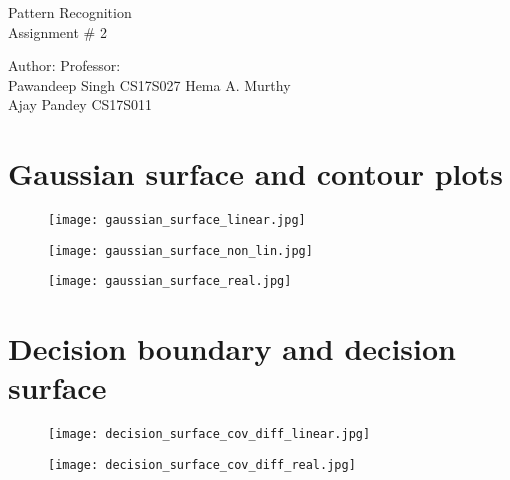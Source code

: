 \documentclass{article}
\begin{document}
	\begin{center}
		\vspace*{10mm}
		{\Huge Pattern Recognition \\}
		\vspace{5mm}
		{\huge Assignment \# 2 \\}
		\vspace{20mm}
	\end{center}
	{\large Author}: \hfill \hfill {\large Professor:} \\
	{\large Pawandeep Singh CS17S027  \hfill \hfill  Hema A. Murthy\\
		Ajay Pandey CS17S011}
	\vspace*{\fill}
	\newpage

 	\section{Gaussian surface and contour plots}
	\begin{figure}[!htb]
			\begin{minipage}{0.97\textwidth}
				\centering
				\texttt{[image: gaussian\_surface\_linear.jpg]}
			\end{minipage}\hfill
			\begin{minipage}{0.97\textwidth}
				\centering
				\texttt{[image: gaussian\_surface\_non\_lin.jpg]}
			\end{minipage}
			\begin{minipage}{0.97\textwidth}
				\centering
				\texttt{[image: gaussian\_surface\_real.jpg]}
			\end{minipage}
	\end{figure}
	\newpage

	\section{Decision boundary and decision surface}
	\begin{figure}[!htb]
		\begin{minipage}{0.97\textwidth}
			\centering
			\texttt{[image: decision\_surface\_cov\_diff\_linear.jpg]}
		\end{minipage}\hfill
		\begin{minipage}{0.97\textwidth}
			\centering
			\texttt{[image: decision\_surface\_cov\_diff\_real.jpg]}
		\end{minipage}
	\end{figure}
	
\end{document}
